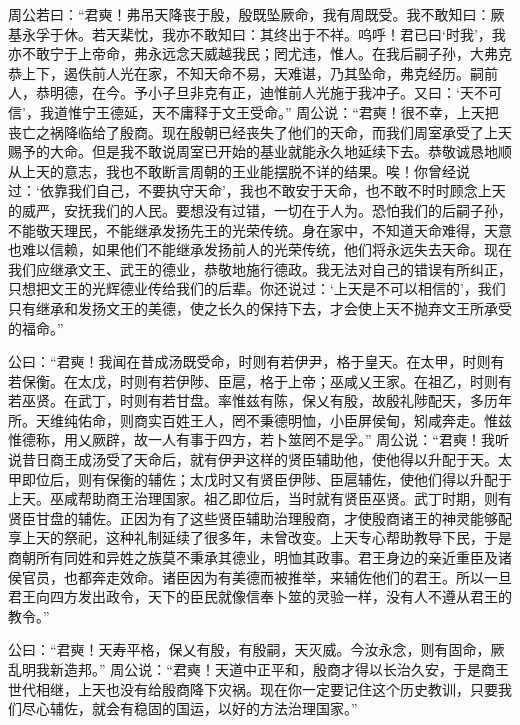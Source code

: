 \documentclass[12pt,UTF8]{ctexbook}
\begin{document}
周公若曰：“君奭！弗吊天降丧于殷，殷既坠厥命，我有周既受。我不敢知曰：厥基永孚于休。若天棐忱，我亦不敢知曰：其终出于不祥。呜呼！君已曰‘时我’，我亦不敢宁于上帝命，弗永远念天威越我民；罔尤违，惟人。在我后嗣子孙，大弗克恭上下，遏佚前人光在家，不知天命不易，天难谌，乃其坠命，弗克经历。嗣前人，恭明德，在今。予小子旦非克有正，迪惟前人光施于我冲子。又曰：‘天不可信’，我道惟宁王德延，天不庸释于文王受命。”
周公说：“君奭！很不幸，上天把丧亡之祸降临给了殷商。现在殷朝已经丧失了他们的天命，而我们周室承受了上天赐予的大命。但是我不敢说周室已开始的基业就能永久地延续下去。恭敬诚恳地顺从上天的意志，我也不敢断言周朝的王业能摆脱不详的结果。唉！你曾经说过：‘依靠我们自己，不要执守天命’，我也不敢安于天命，也不敢不时时顾念上天的威严，安抚我们的人民。要想没有过错，一切在于人为。恐怕我们的后嗣子孙，不能敬天理民，不能继承发扬先王的光荣传统。身在家中，不知道天命难得，天意也难以信赖，如果他们不能继承发扬前人的光荣传统，他们将永远失去天命。现在我们应继承文王、武王的德业，恭敬地施行德政。我无法对自己的错误有所纠正，只想把文王的光辉德业传给我们的后辈。你还说过：‘上天是不可以相信的’，我们只有继承和发扬文王的美德，使之长久的保持下去，才会使上天不抛弃文王所承受的福命。”

公曰：“君奭！我闻在昔成汤既受命，时则有若伊尹，格于皇天。在太甲，时则有若保衡。在太戊，时则有若伊陟、臣扈，格于上帝；巫咸乂王家。在祖乙，时则有若巫贤。在武丁，时则有若甘盘。率惟兹有陈，保乂有殷，故殷礼陟配天，多历年所。天维纯佑命，则商实百姓王人，罔不秉德明恤，小臣屏侯甸，矧咸奔走。惟兹惟德称，用乂厥辟，故一人有事于四方，若卜筮罔不是孚。”
周公说：“君奭！我听说昔日商王成汤受了天命后，就有伊尹这样的贤臣辅助他，使他得以升配于天。太甲即位后，则有保衡的辅佐；太戊时又有贤臣伊陟、臣扈辅佐，使他们得以升配于上天。巫咸帮助商王治理国家。祖乙即位后，当时就有贤臣巫贤。武丁时期，则有贤臣甘盘的辅佐。正因为有了这些贤臣辅助治理殷商，才使殷商诸王的神灵能够配享上天的祭祀，这种礼制延续了很多年，未曾改变。上天专心帮助教导下民，于是商朝所有同姓和异姓之族莫不秉承其德业，明恤其政事。君王身边的亲近重臣及诸侯官员，也都奔走效命。诸臣因为有美德而被推举，来辅佐他们的君王。所以一旦君王向四方发出政令，天下的臣民就像信奉卜筮的灵验一样，没有人不遵从君王的教令。”

公曰：“君奭！天寿平格，保乂有殷，有殷嗣，天灭威。今汝永念，则有固命，厥乱明我新造邦。”
周公说：“君奭！天道中正平和，殷商才得以长治久安，于是商王世代相继，上天也没有给殷商降下灾祸。现在你一定要记住这个历史教训，只要我们尽心辅佐，就会有稳固的国运，以好的方法治理国家。”
\end{document}
